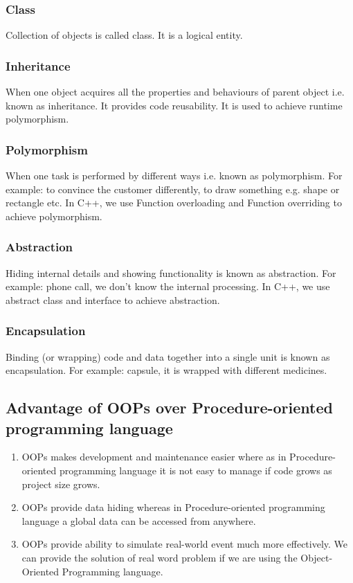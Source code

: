 \documentclass{book}
\begin{document}
\subsubsection{Class}
Collection of objects is called class. It is a logical entity.

\subsubsection{Inheritance}
When one object acquires all the properties and behaviours of parent object i.e. known as inheritance. It provides code reusability. It is used to achieve runtime polymorphism.

\subsubsection{Polymorphism}
When one task is performed by different ways i.e. known as polymorphism. For example: to convince the customer differently, to draw something e.g. shape or rectangle etc. In C++, we use Function overloading and Function overriding to achieve polymorphism.

\subsubsection{Abstraction}
Hiding internal details and showing functionality is known as abstraction. For example: phone call, we don't know the internal processing. In C++, we use abstract class and interface to achieve abstraction.

\subsubsection{Encapsulation}
Binding (or wrapping) code and data together into a single unit is known as encapsulation. For example: capsule, it is wrapped with different medicines.


\subsection{Advantage of OOPs over Procedure-oriented programming language}
\begin{enumerate}
	\item OOPs makes development and maintenance easier where as in Procedure-oriented programming language it is not easy to manage if code grows as project size grows.
	\item OOPs provide data hiding whereas in Procedure-oriented programming language a global data can be accessed from anywhere.
\item OOPs provide ability to simulate real-world event much more effectively. We can provide the solution of real word problem if we are using the Object-Oriented Programming language.

\end{enumerate}
\end{document}
